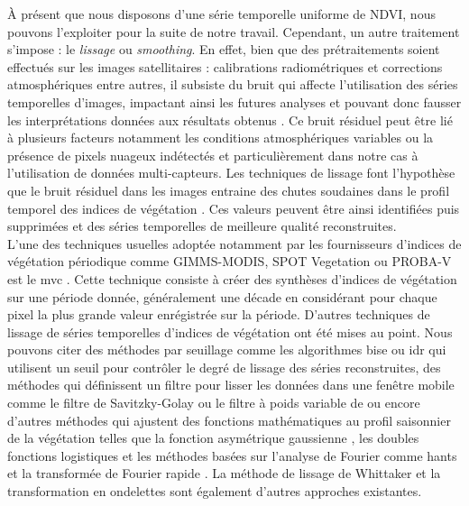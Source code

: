 \`A présent que nous disposons d'une série temporelle uniforme de NDVI, nous pouvons l'exploiter pour la suite de notre travail. Cependant, un autre traitement s'impose : le \emph{lissage} ou \emph{smoothing}. En effet, bien que des prétraitements soient effectués sur les images satellitaires : calibrations radiométriques et corrections atmosphériques entre autres, il subsiste du bruit qui affecte l'utilisation des séries temporelles d'images, impactant ainsi les futures analyses et pouvant donc fausser les interprétations données aux résultats obtenus \citep{Chen2004}. Ce bruit résiduel peut être lié à plusieurs facteurs notamment les conditions atmosphériques variables ou la présence de pixels nuageux indétectés et particulièrement dans notre cas à l'utilisation de données multi-capteurs. Les techniques de lissage font l'hypothèse que le bruit résiduel dans les images entraine des chutes soudaines dans le profil temporel des indices de végétation \citep{Bojanowski2009}. Ces valeurs peuvent être ainsi identifiées puis supprimées et des séries temporelles de meilleure qualité reconstruites.
\\L'une des techniques usuelles adoptée notamment par les fournisseurs d'indices de végétation périodique comme GIMMS-MODIS, SPOT Vegetation ou PROBA-V est le \acrshort{mvc} \citep{Holben1986}. Cette technique 
consiste à créer des synthèses d'indices de végétation sur une période donnée, généralement une décade en considérant pour chaque pixel la plus grande valeur enrégistrée sur la période.
D'autres techniques de lissage de séries temporelles d'indices de végétation ont été mises au point. Nous pouvons citer des méthodes par seuillage comme les algorithmes \acrshort{bise} \citep{Viovy1992} ou \acrshort{idr} \citep{Julien2010} qui utilisent un seuil pour contrôler le degré de lissage des séries reconstruites, des méthodes qui définissent un filtre pour lisser les données dans une fenêtre mobile comme le filtre de Savitzky-Golay \citep{Savitzky1964, Chen2004} ou le filtre à poids variable de \citet{Zhu2012} ou encore d'autres méthodes qui ajustent des fonctions mathématiques au profil saisonnier de la végétation telles que la fonction asymétrique gaussienne \citep{Jonsson2002}, les doubles fonctions logistiques \citep{Beck2006} et les méthodes basées sur l'analyse de Fourier comme \acrshort{hants} \citep{Verhoef1996, Roerink2000} et la transformée de Fourier rapide \citep{Menenti1993}. La méthode de lissage de Whittaker \citep{Eilers2003,Atzberger2011} et la transformation en ondelettes \citep{Lu2007} sont également d'autres approches existantes.

